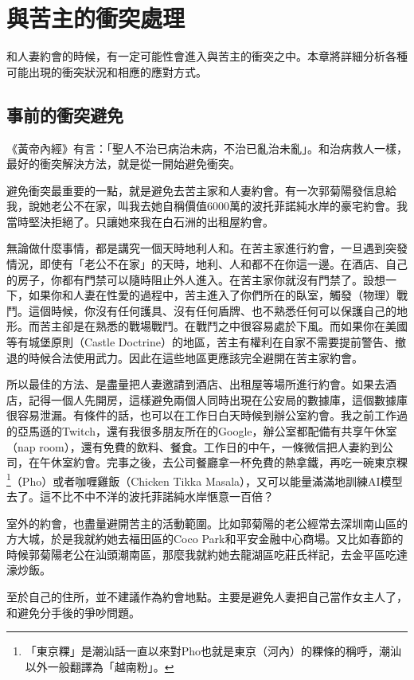 \chapter{與苦主的衝突處理}

和人妻約會的時候，有一定可能性會進入與苦主的衝突之中。本章將詳細分析各種可能出現的衝突狀況和相應的應對方式。

\section{事前的衝突避免}

《黃帝內經》有言：「聖人不治已病治未病，不治已亂治未亂」。和治病救人一樣，最好的衝突解決方法，就是從一開始避免衝突。

避免衝突最重要的一點，就是避免去苦主家和人妻約會。有一次郭菊陽發信息給我，說她老公不在家，叫我去她自稱價值6000萬的波托菲諾純水岸的豪宅約會。我當時堅決拒絕了。只讓她來我在白石洲的出租屋約會。

無論做什麼事情，都是講究一個天時地利人和。在苦主家進行約會，一旦遇到突發情況，即使有「老公不在家」的天時，地利、人和都不在你這一邊。在酒店、自己的房子，你都有門禁可以隨時阻止外人進入。在苦主家你就沒有門禁了。設想一下，如果你和人妻在性愛的過程中，苦主進入了你們所在的臥室，觸發（物理）戰鬥。這個時候，你沒有任何護具、沒有任何盾牌、也不熟悉任何可以保護自己的地形。而苦主卻是在熟悉的戰場戰鬥。在戰鬥之中很容易處於下風。而如果你在美國等有城堡原則（Castle Doctrine）的地區，苦主有權利在自家不需要提前警告、撤退的時候合法使用武力。因此在這些地區更應該完全避開在苦主家約會。

所以最佳的方法、是盡量把人妻邀請到酒店、出租屋等場所進行約會。如果去酒店，記得一個人先開房，這樣避免兩個人同時出現在公安局的數據庫，這個數據庫很容易泄漏。有條件的話，也可以在工作日白天時候到辦公室約會。我之前工作過的亞馬遜的Twitch，還有我很多朋友所在的Google，辦公室都配備有共享午休室（nap room），還有免費的飲料、餐食。工作日的中午，一條微信把人妻約到公司，在午休室約會。完事之後，去公司餐廳拿一杯免費的熱拿鐵，再吃一碗東京粿\footnote{「東京粿」是潮汕話一直以來對Pho也就是東京（河內）的粿條的稱呼，潮汕以外一般翻譯為「越南粉」。}（Pho）或者咖喱雞飯（Chicken Tikka Masala），又可以能量滿滿地訓練AI模型去了。這不比不中不洋的波托菲諾純水岸愜意一百倍？

室外的約會，也盡量避開苦主的活動範圍。比如郭菊陽的老公經常去深圳南山區的方大城，於是我就約她去福田區的Coco Park和平安金融中心商場。又比如春節的時候郭菊陽老公在汕頭潮南區，那麼我就約她去龍湖區吃莊氏祥記，去金平區吃達濠炒飯。

至於自己的住所，並不建議作為約會地點。主要是避免人妻把自己當作女主人了，和避免分手後的爭吵問題。

